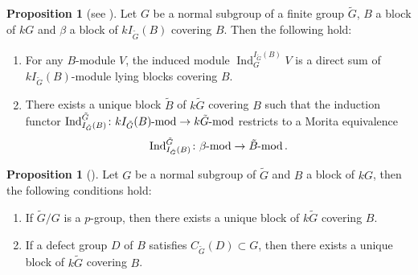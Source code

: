 \documentclass[pdftex,a4paper]{article}
\numberwithin{equation}{subsection}
\theoremstyle{definition}
\newtheorem{proposition}[theorem]{Proposition}
\newcommand{\lmod}{\operatorname{\mathrm{\hspace{-2pt}-mod}}}
\newcommand{\induc}{{\operatorname{Ind}\nolimits}}
\newcommand{\inertiagp}{I}
\begin{document}
\begin{proposition}[{see \cite[Theorem 5.5.12, Theorem 5.5.13, Lemma 5.5.14]{MR998775}}]\label{Morita equivalence covering block}
	Let \(G\) be a normal subgroup of a finite group \(\tilde{G}\), \(B\) a block of \(kG\) and \(\beta\) a block of \(k\inertiagp_{\tilde{G}}(B)\) covering \(B\).
	Then the following hold:
	\begin{enumerate}
		\item  For any \(B\)-module \(V\), the induced module \(\induc_G^{\inertiagp_{\tilde{G}}(B)}V\) is a direct sum of \(k\inertiagp_{\tilde{G}}(B)\)-module lying blocks covering \(B\).
		\item There exists a unique block \(\tilde{B}\) of \(k\tilde{G}\) covering \(B\) such that the induction functor \(\induc_{\inertiagp_{\tilde{G}}(B)}^{\tilde{G}} \colon k\inertiagp_{\tilde{G}}(B)\lmod \rightarrow k{\tilde{G}}\lmod\) restricts to a Morita equivalence
		      \begin{equation}\label{2020-03-25 15:17:09}
			      \induc_{\inertiagp_{\tilde{G}}(B)}^{\tilde{G}} \colon \beta\lmod \rightarrow \tilde{B}\lmod.
		      \end{equation}
	\end{enumerate}
\end{proposition}


\begin{proposition}[{\cite[Corollary 5.5.6, Theorem 5.5.13, Lemma 5.5.14]{MR998775}}]\label{p-power index covering uniqueness}
	Let \(G\) be a normal subgroup of \(\tilde{G}\) and \(B\) a block of \(kG\), then the following conditions hold:
	\begin{enumerate}
		\item If \(\tilde{G}/G\) is a \(p\)-group, then there exists a unique block of \(k\tilde{G}\) covering \(B\).
		\item If a defect group \(D\) of \(B\) satisfies \(C_{\tilde{G}}(D)\subset G\), then  there exists a unique block of \(k\tilde{G}\) covering \(B\).
	\end{enumerate}
\end{proposition}
\end{document}
